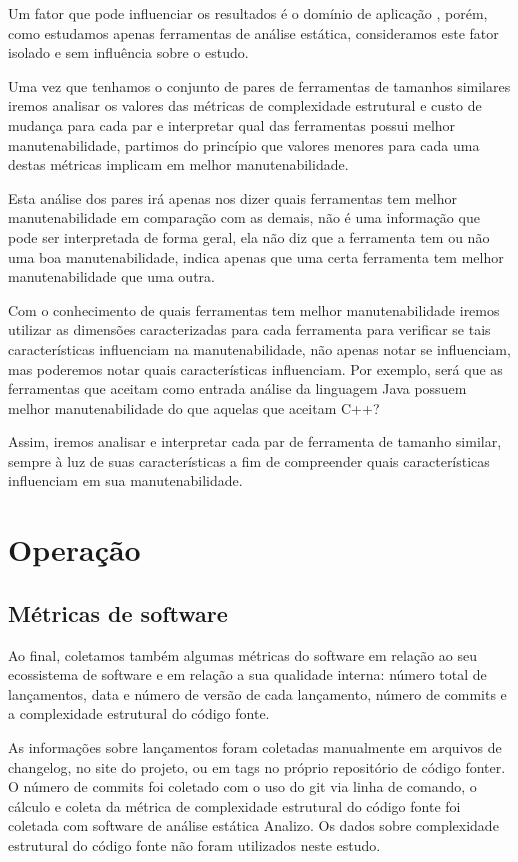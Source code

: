 Um fator que pode influenciar os resultados é o domínio de aplicação
\cite{terceiro2012understanding, kumar2012survey}, porém, como estudamos apenas
ferramentas de análise estática, consideramos este fator isolado e sem
influência sobre o estudo.

Uma vez que tenhamos o conjunto de pares de ferramentas de tamanhos similares
iremos analisar os valores das métricas de complexidade estrutural e custo de
mudança para cada par e interpretar qual das ferramentas possui melhor
manutenabilidade, partimos do princípio que valores menores para cada uma
destas métricas implicam em melhor manutenabilidade.

Esta análise dos pares irá apenas nos dizer quais ferramentas tem melhor
manutenabilidade em comparação com as demais, não é uma informação que
pode ser interpretada de forma geral, ela não diz que a ferramenta tem
ou não uma boa manutenabilidade, indica apenas que uma certa ferramenta
tem melhor manutenabilidade que uma outra.

Com o conhecimento de quais ferramentas tem melhor manutenabilidade iremos
utilizar as dimensões caracterizadas para cada ferramenta para verificar se
tais características influenciam na manutenabilidade, não apenas notar se
influenciam, mas poderemos notar quais características influenciam. Por
exemplo, será que as ferramentas que aceitam como entrada análise da linguagem
Java possuem melhor manutenabilidade do que aquelas que aceitam C++?

Assim, iremos analisar e interpretar cada par de ferramenta de tamanho
similar, sempre à luz de suas características a fim de compreender quais
características influenciam em sua manutenabilidade.


\section{Operação} 

\subsection{Métricas de software}

Ao final, coletamos também algumas métricas do software em relação ao seu
ecossistema de software e em relação a sua qualidade interna: número
total de lançamentos, data e número de versão de cada lançamento, número de
commits e a complexidade estrutural do código fonte.

As informações sobre lançamentos foram coletadas manualmente em arquivos de
changelog, no site do projeto, ou em tags no próprio repositório de código
fonter. O número de commits foi coletado com o uso do git via linha de comando,
o cálculo e coleta da métrica de complexidade estrutural do código fonte foi
coletada com software de análise estática Analizo.
Os dados sobre complexidade estrutural do código fonte não foram utilizados
neste estudo.

